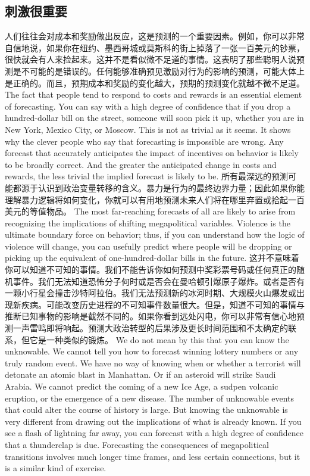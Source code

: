 \subsection{刺激很重要}
\begin{paracol}{2}
人们往往会对成本和奖励做出反应，这是预测的一个重要因素。例如，你可以非常自信地说，如果你在纽约、墨西哥城或莫斯科的街上掉落了一张一百美元的钞票，很快就会有人来捡起来。这并不是看似微不足道的事情。这表明了那些聪明人说预测是不可能的是错误的。任何能够准确预见激励对行为的影响的预测，可能大体上是正确的。而且，预期成本和奖励的变化越大，预期的预测变化就越不微不足道。
\switchcolumn
The fact that people tend to respond to costs and rewards is an essential element of forecasting. You can say with a high degree of confidence that if you drop a hundred-dollar bill on the street, someone will soon pick it up, whether you are in New York, Mexico City, or Moscow. This is not as trivial as it seems. It shows why the clever people who say that forecasting is impossible are wrong. Any forecast that accurately anticipates the impact of incentives on behavior is likely to be broadly correct. And the greater the anticipated change in costs and rewards, the less trivial the implied forecast is likely to be.    
\switchcolumn*
所有最深远的预测可能都源于认识到政治变量转移的含义。暴力是行为的最终边界力量；因此如果你能理解暴力逻辑将如何变化，你就可以有用地预测未来人们将在哪里弃置或拾起一百美元的等值物品。
\switchcolumn
The most far-reaching forecasts of all are likely to arise from recognizing the implications of shifting megapolitical variables. Violence is the ultimate boundary force on behavior; thus, if you can understand how the logic of violence will change, you can usefully predict where people will be dropping or picking up the equivalent of one-hundred-dollar bills in the future.    
\switchcolumn*
这并不意味着你可以知道不可知的事情。我们不能告诉你如何预测中奖彩票号码或任何真正的随机事件。我们无法知道恐怖分子何时或是否会在曼哈顿引爆原子爆炸。或者是否有一颗小行星会撞击沙特阿拉伯。我们无法预测新的冰河时期、大规模火山爆发或出现新疾病。可能改变历史进程的不可知事件数量很大。但是，知道不可知的事情与推断已知事物的影响是截然不同的。如果你看到远处闪电，你可以非常有信心地预测一声雷鸣即将响起。预测大政治转型的后果涉及更长时间范围和不太确定的联系，但它是一种类似的锻炼。
\switchcolumn
We do not mean by this that you can know the unknowable. We cannot tell you how to forecast winning lottery numbers or any truly random event. We have no way of knowing when or whether a terrorist will detonate an atomic blast in Manhattan. Or if an asteroid will strike Saudi Arabia. We cannot predict the coming of a new Ice Age, a sudpen volcanic eruption, or the emergence of a new disease. The number of unknowable events that could alter the course of history is large. But knowing the unknowable is very different from drawing out the implications of what is already known. If you see a flash of lightning far away, you can forecast with a high degree of confidence that a thunderclap is due. Forecasting the consequences of megapolitical transitions involves much longer time frames, and less certain connections, but it is a similar kind of exercise.    

\end{paracol}
